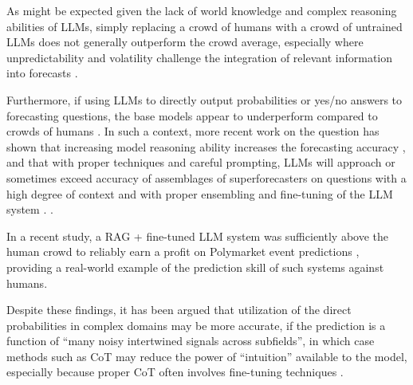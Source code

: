 \documentclass[12pt,a4paper]{article}
\begin{document}
As might be expected given the lack of world knowledge and complex reasoning abilities of LLMs, simply replacing a crowd of humans with a crowd of untrained LLMs does not generally outperform the crowd average, especially where unpredictability and volatility challenge the integration of relevant information into forecasts  .

Furthermore, if using LLMs to directly output probabilities or yes/no answers to forecasting questions, the base models appear to underperform compared to crowds of humans  . In such a context, more recent work on the question has shown that increasing model reasoning ability increases the forecasting accuracy , and that with proper techniques and careful prompting, LLMs will approach or sometimes exceed accuracy of assemblages of superforecasters on questions with a high degree of context and with proper ensembling and fine-tuning of the LLM system .   . 

In a recent study, a RAG + fine-tuned LLM system was sufficiently above the human crowd to reliably earn a profit on Polymarket event predictions , providing a real-world example of the prediction skill of such systems against humans.

Despite these findings, it has been argued that utilization of the direct probabilities in complex domains may be more accurate, if the prediction is a function of ``many noisy intertwined signals across subfields'', in which case methods such as CoT may reduce the power of ``intuition'' available to the model, especially because proper CoT often involves fine-tuning techniques .
\end{document}
